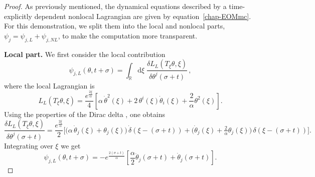 \documentclass{article} %
\def\eqref#1{equation~\ref{#1}}
\begin{document}
\begin{proof}
As previously mentioned, the dynamical equations described by a time-explicitly
dependent nonlocal Lagrangian are given by \eqref{chap-EOMmc}. For this
demonstration, we split them into the local and nonlocal parts,
$\psi_j = \psi_{j,L} +\psi_{j,NL}$, to make the computation more transparent.

\noindent\textbf{Local part.}
We first consider the local contribution
\[
\psi_{j,L}(\theta, t+\sigma)
=
\int_\mathbb{R}\mathrm{d}\xi\;
\frac{\delta L_L(T_\xi \theta, \xi)}{\delta \theta^j(\sigma+t)}\,,
\]
where the local Lagrangian is
\[
L_L(T_\xi\theta,\xi)
=
\frac{e^{\frac{2\xi}{\alpha}}}{4}
\left[
\alpha\,\dot \theta^2(\xi)
+ 2\,\theta^i(\xi)\dot\theta_i(\xi)
+ \frac{2}{\alpha}\theta^2(\xi)
\right].
\]
Using the properties of the Dirac delta \cite{Vladimirov_GF}, one obtains
\[
\frac{\delta L_L(T_\xi \theta, \xi)}{\delta \theta^j(\sigma+t)}
=
\frac{e^{\frac{2\xi}{\alpha}}}{2}
\Big[
\big(\alpha\,\dot\theta_j(\xi) + \theta_j(\xi)\big)\,\dot\delta(\xi-(\sigma+t))
+
\big(\dot\theta_j(\xi) + \tfrac{2}{\alpha} \theta_j(\xi)\big)\,\delta(\xi-(\sigma+t))
\Big].
\]
Integrating over $\xi$ we get
\[
\psi_{j,L}(\theta,t+\sigma)
=
-e^{\frac{2(\sigma+t)}{\alpha}}
\left[
\frac{\alpha}{2}\ddot \theta_j(\sigma+t)
+ \dot \theta_j(\sigma+t)
\right].
\]


\end{proof}
\end{document}
